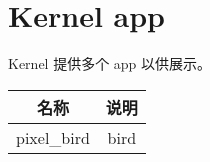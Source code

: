 %
%
%
%
%
%
%
%

\chapter{Kernel app}
Kernel 提供多个 app 以供展示。\\

\noindent\begin{tabular}{|c|c|}
    \hline
    名称 & 说明\\\hline
    pixel\_bird & bird\\\hline
\end{tabular}\\
